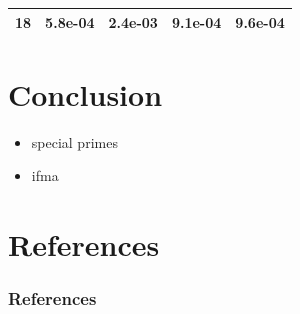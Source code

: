 \documentclass[10pt]{beamer}
\begin{document}
\begin{frame}
\begin{center}
\begin{longtable}{|r|*{4}{c|}}
            \hline
            \cellcolor{myGray} 18 & 5.8e-04 & 2.4e-03 & 9.1e-04 & 9.6e-04 \\
            \hline
        \end{longtable}
    \end{center}
\end{frame}

\section{Conclusion}
\begin{frame}
    \begin{itemize}
        \item special primes
        \item ifma
    \end{itemize}
\end{frame}

\section*{References}
\begin{frame}
    \frametitle{References}

     
     
    \nocite{*}
\end{frame}
\end{document}
